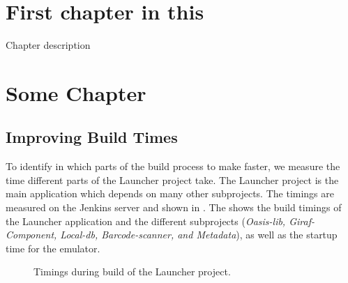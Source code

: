 \chapter{First chapter in this}%
Chapter description



\chapter{Some Chapter}
\section{Improving Build Times}

To identify in which parts of the build process to make faster, we measure the time different parts of the Launcher project take. The Launcher project is the main application which depends on many other subprojects. The timings are measured on the Jenkins server and shown in . The shows the build timings of the Launcher application and the different subprojects (\emph{Oasis-lib, Giraf-Component, Local-db, Barcode-scanner, and Metadata}), as well as the startup time for the emulator.

\begin{figure}
\caption{Timings during build of the Launcher project.}\label{fig:launcher_build_times}
\end{figure}